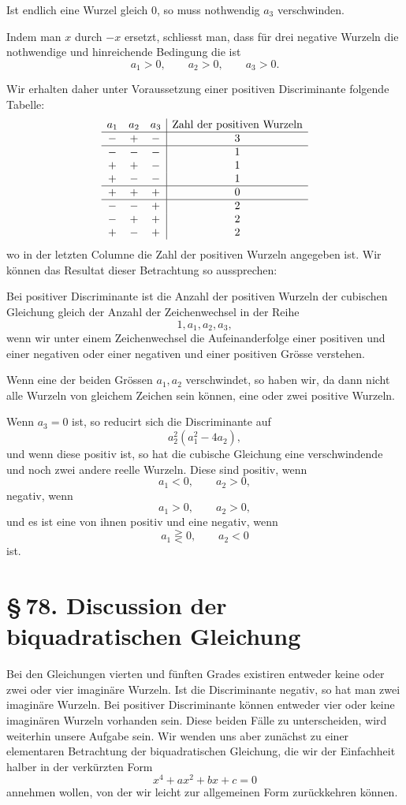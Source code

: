 \documentclass[11pt]{article}
\providecommand{\sect}[2]{\section*{\S\,#1. #2}}
\begin{document}
Ist endlich eine Wurzel gleich $0$, so muss nothwendig $a_3$ verschwinden.

Indem man $x$ durch $-x$ ersetzt, schliesst man, dass f\"ur drei negative Wurzeln die nothwendige und hinreichende Bedingung die ist
\begin{equation}
        a_1>0,
        \qquad a_2>0,
        \qquad a_3>0.
\tag{4}
\end{equation}

Wir erhalten daher unter Voraussetzung einer positiven Discriminante folgende Tabelle:
\[
\begin{array}{ccc|c}
 a_1 & a_2 & a_3 & \text{Zahl der positiven Wurzeln}\cr\hline
 - & + & - & 3\cr\hline
 - & - & - & 1\cr
 + & + & - & 1\cr
 + & - & - & 1\cr\hline
 + & + & + & 0\cr\hline
 - & - & + & 2\cr
 - & + & + & 2\cr
 + & - & + & 2
\end{array}
\]
wo in der letzten Columne die Zahl der positiven Wurzeln angegeben ist. Wir k\"onnen das Resultat dieser Betrachtung so aussprechen:

Bei positiver Discriminante ist die Anzahl der positiven Wurzeln der cubischen Gleichung gleich der Anzahl der Zeichenwechsel in der Reihe
\[
        1,a_1,a_2,a_3,
\]
wenn wir unter einem Zeichenwechsel die Aufeinanderfolge einer positiven und einer negativen oder einer negativen und einer positiven Gr\"osse verstehen.

Wenn eine der beiden Gr\"ossen $a_1,a_2$ verschwindet, so haben wir, da dann nicht alle Wurzeln von gleichem Zeichen sein k\"onnen, eine oder zwei positive Wurzeln.

Wenn $a_3=0$ ist, so reducirt sich die Discriminante auf
\[
        a_2^2(a_1^2-4a_2),
\]
und wenn diese positiv ist, so hat die cubische Gleichung eine verschwindende und noch zwei andere reelle Wurzeln. Diese sind positiv, wenn
\[
        a_1<0,\qquad a_2>0,
\]
negativ, wenn
\[
        a_1>0,\qquad a_2>0,
\]
und es ist eine von ihnen positiv und eine negativ, wenn
\[
        a_1\gtreqless 0,\qquad a_2<0
\]
ist.

\sect{78}{Discussion der biquadratischen Gleichung}

Bei den Gleichungen vierten und f\"unften Grades existiren entweder keine oder zwei oder vier imagin\"are Wurzeln. Ist die Discriminante negativ, so hat man zwei imagin\"are Wurzeln. Bei positiver Discriminante k\"onnen entweder vier oder keine imagin\"aren Wurzeln vorhanden sein. Diese beiden F\"alle zu unterscheiden, wird weiterhin unsere Aufgabe sein. Wir wenden uns aber zun\"achst zu einer elementaren Betrachtung der biquadratischen Gleichung, die wir der Einfachheit halber in der verk\"urzten Form
\begin{equation}
        x^4+ax^2+bx+c=0
\tag{1}
\end{equation}
annehmen wollen, von der wir leicht zur allgemeinen Form zur\"uckkehren k\"onnen.
\end{document}
